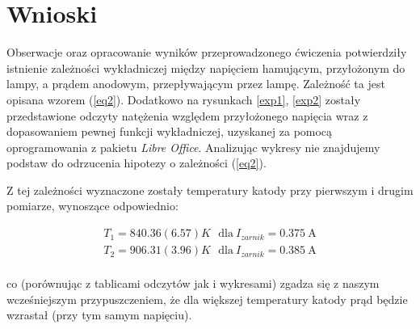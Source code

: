 \documentclass[a4paper]{article}
\newlength{\du}
\begin{document}
%

\section{Wnioski}

Obserwacje oraz opracowanie wyników przeprowadzonego ćwiczenia potwierdziły istnienie zależności
wykładniczej między napięciem hamującym, przyłożonym do lampy, a prądem anodowym,
przepływającym przez lampę. Zależność ta jest opisana wzorem (\ref{eq2}).
Dodatkowo na rysunkach \ref{exp1}, \ref{exp2} zostały przedstawione odczyty natężenia względem
przyłożonego napięcia wraz z dopasowaniem pewnej funkcji wykładniczej, uzyskanej za pomocą oprogramowania 
z pakietu \textit{Libre Office}. Analizując wykresy nie znajdujemy podstaw do odrzucenia hipotezy
o zależności (\ref{eq2}).

Z tej zależności wyznaczone zostały temperatury katody przy pierwszym i drugim pomiarze,
wynoszące odpowiednio:

\begin{align*}
	T_1 = 840.36(6.57) K \ \ \ \text{dla} \ I_{zarnik} = 0.375 \ \text{A} \\
	T_2 = 906.31(3.96) K \ \ \ \text{dla} \ I_{zarnik} = 0.385 \ \text{A} \\
\end{align*}

co (porównując z tablicami odczytów jak i wykresami) zgadza się z naszym wcześniejszym przypuszczeniem,
że dla większej temperatury katody prąd będzie wzrastał (przy tym samym napięciu).
\vspace{1em}
\end{document}
